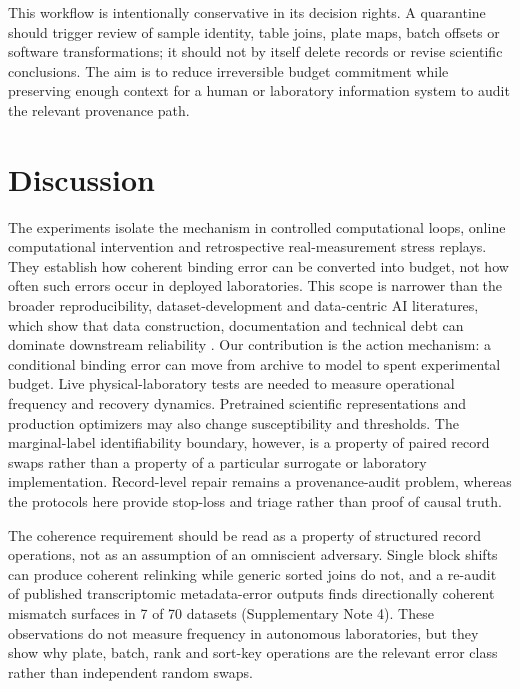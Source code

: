 This workflow is intentionally conservative in its decision rights. A quarantine should trigger review of sample identity, table joins, plate maps, batch offsets or software transformations; it should not by itself delete records or revise scientific conclusions. The aim is to reduce irreversible budget commitment while preserving enough context for a human or laboratory information system to audit the relevant provenance path.

\section*{Discussion}

The experiments isolate the mechanism in controlled computational loops, online computational intervention and retrospective real-measurement stress replays. They establish how coherent binding error can be converted into budget, not how often such errors occur in deployed laboratories. This scope is narrower than the broader reproducibility, dataset-development and data-centric AI literatures, which show that data construction, documentation and technical debt can dominate downstream reliability \citep{baker2016reproducibility,paullada2021datadiscontents,sculley2015technicaldebt,zha2025datacentric}. Our contribution is the action mechanism: a conditional binding error can move from archive to model to spent experimental budget. Live physical-laboratory tests are needed to measure operational frequency and recovery dynamics. Pretrained scientific representations and production optimizers may also change susceptibility and thresholds. The marginal-label identifiability boundary, however, is a property of paired record swaps rather than a property of a particular surrogate or laboratory implementation. Record-level repair remains a provenance-audit problem, whereas the protocols here provide stop-loss and triage rather than proof of causal truth.

The coherence requirement should be read as a property of structured record operations, not as an assumption of an omniscient adversary. Single block shifts can produce coherent relinking while generic sorted joins do not, and a re-audit of published transcriptomic metadata-error outputs finds directionally coherent mismatch surfaces in 7 of 70 datasets (Supplementary Note 4). These observations do not measure frequency in autonomous laboratories, but they show why plate, batch, rank and sort-key operations are the relevant error class rather than independent random swaps.

